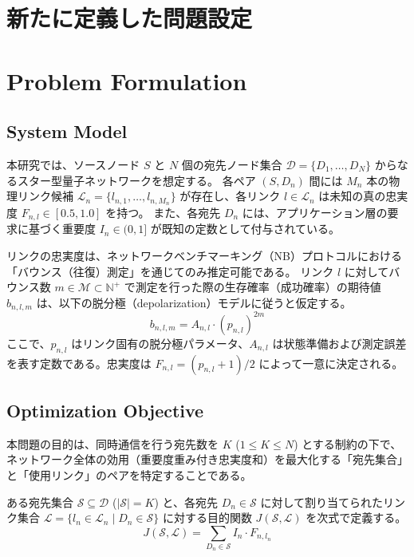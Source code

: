 \documentclass[conference]{IEEEtran}
\begin{document}
\section*{新たに定義した問題設定}
\label{sec:org6a22186}

\section{Problem Formulation}

\subsection{System Model}
本研究では、ソースノード $S$ と $N$ 個の宛先ノード集合 $\mathcal{D} = \{D_1, \dots, D_N\}$ からなるスター型量子ネットワークを想定する。
各ペア $(S, D_n)$ 間には $M_n$ 本の物理リンク候補 $\mathcal{L}_n = \{l_{n,1}, \dots, l_{n, M_n}\}$ が存在し、各リンク $l \in \mathcal{L}_n$ は未知の真の忠実度 $F_{n,l} \in [0.5, 1.0]$ を持つ。
また、各宛先 $D_n$ には、アプリケーション層の要求に基づく重要度 $I_n \in (0, 1]$ が既知の定数として付与されている。

リンクの忠実度は、ネットワークベンチマーキング（NB）プロトコルにおける「バウンス（往復）測定」を通じてのみ推定可能である。
リンク $l$ に対してバウンス数 $m \in \mathcal{M} \subset \mathbb{N}^+$ で測定を行った際の生存確率（成功確率）の期待値 $b_{n,l,m}$ は、以下の脱分極（depolarization）モデルに従うと仮定する。
\begin{equation}
    b_{n,l,m} = A_{n,l} \cdot (p_{n,l})^{2m}
\end{equation}
ここで、$p_{n,l}$ はリンク固有の脱分極パラメータ、$A_{n,l}$ は状態準備および測定誤差を表す定数である。忠実度は $F_{n,l} = (p_{n,l} + 1)/2$ によって一意に決定される。

\subsection{Optimization Objective}
本問題の目的は、同時通信を行う宛先数を $K$ ($1 \le K \le N$) とする制約の下で、ネットワーク全体の効用（重要度重み付き忠実度和）を最大化する「宛先集合」と「使用リンク」のペアを特定することである。

ある宛先集合 $\mathcal{S} \subseteq \mathcal{D}$ ($|\mathcal{S}| = K$) と、各宛先 $D_n \in \mathcal{S}$ に対して割り当てられたリンク集合 $\mathcal{L} = \{l_n \in \mathcal{L}_n \mid D_n \in \mathcal{S}\}$ に対する目的関数 $J(\mathcal{S}, \mathcal{L})$ を次式で定義する。
\begin{equation}
    J(\mathcal{S}, \mathcal{L}) = \sum_{D_n \in \mathcal{S}} I_n \cdot F_{n, l_n}
\end{equation}
\end{document}
